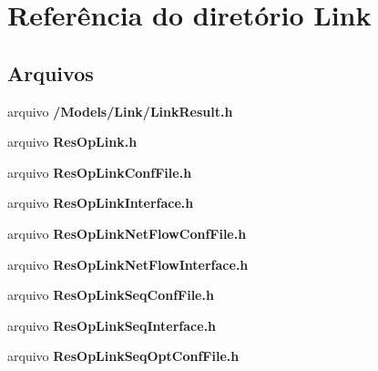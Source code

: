 \section{Referência do diretório Link}
\label{dir_3bcd9011d1c80114d9801cd9511c449f}
\subsection*{Arquivos}
\begin{DoxyCompactItemize}
\item 
arquivo {\bf /\+Models/\+Link/\+Link\+Result.\+h}
\item 
arquivo {\bf Res\+Op\+Link.\+h}
\item 
arquivo {\bf Res\+Op\+Link\+Conf\+File.\+h}
\item 
arquivo {\bf Res\+Op\+Link\+Interface.\+h}
\item 
arquivo {\bf Res\+Op\+Link\+Net\+Flow\+Conf\+File.\+h}
\item 
arquivo {\bf Res\+Op\+Link\+Net\+Flow\+Interface.\+h}
\item 
arquivo {\bf Res\+Op\+Link\+Seq\+Conf\+File.\+h}
\item 
arquivo {\bf Res\+Op\+Link\+Seq\+Interface.\+h}
\item 
arquivo {\bf Res\+Op\+Link\+Seq\+Opt\+Conf\+File.\+h}
\end{DoxyCompactItemize}
